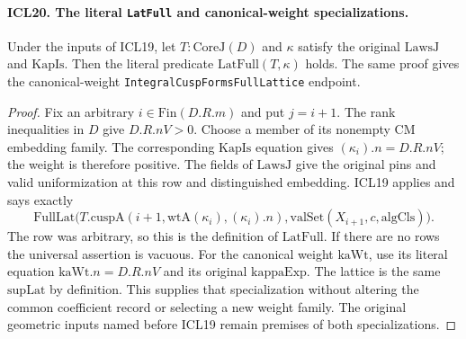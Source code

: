 \documentclass[11pt,a4paper]{article}
\numberwithin{equation}{section}
\theoremstyle{remark}\newtheorem{remark}[theorem]{Remark}
\begin{document}
\paragraph{ICL20. The literal \texttt{Lat\allowbreak Full} and canonical-weight specializations.}
\label{claim:ICL20}
Under the inputs of ICL19, let \(T:\mathrm{CoreJ}(D)\)
and \(\kappa\) satisfy the original \(\mathrm{LawsJ}\)
and \(\mathrm{KapIs}\).  Then the literal predicate
\(\mathrm{LatFull}(T,\kappa)\) holds.  The same proof
gives the canonical-weight
\texttt{Integral\allowbreak Cusp\allowbreak Forms\allowbreak Full\allowbreak Lattice} endpoint.
\begin{proof}
Fix an arbitrary \(i\in\mathrm{Fin}(D.R.m)\) and
put \(j=i+1\).  The rank inequalities in \(D\)
give \(D.R.nV>0\).  Choose a member of its
nonempty CM embedding family.  The corresponding
\(\mathrm{KapIs}\) equation gives
\((\kappa_i).n=D.R.nV\); the weight is therefore
positive.  The fields of \(\mathrm{LawsJ}\)
give the original pins and valid uniformization
at this row and distinguished embedding.  ICL19
applies and says exactly
\[
 \mathrm{FullLat}\bigl(T.\mathrm{cuspA}(i+1,
                 \mathrm{wtA}(\kappa_i),(\kappa_i).n),
                 \mathrm{valSet}(X_{i+1},c,\mathrm{algCls})\bigr).
\]
The row was arbitrary, so this is the definition
of \(\mathrm{LatFull}\).  If there are no rows the
universal assertion is vacuous.  For the canonical
weight \(\mathrm{kaWt}\), use its literal equation
\(\mathrm{kaWt}.n=D.R.nV\) and its original
\(\mathrm{kappaExp}\).  The lattice is the same
\(\mathrm{supLat}\) by definition.  This supplies
that specialization without altering the common
coefficient record or selecting a new weight family.
The original geometric inputs named before ICL19
remain premises of both specializations.
\end{proof}

\end{document}
